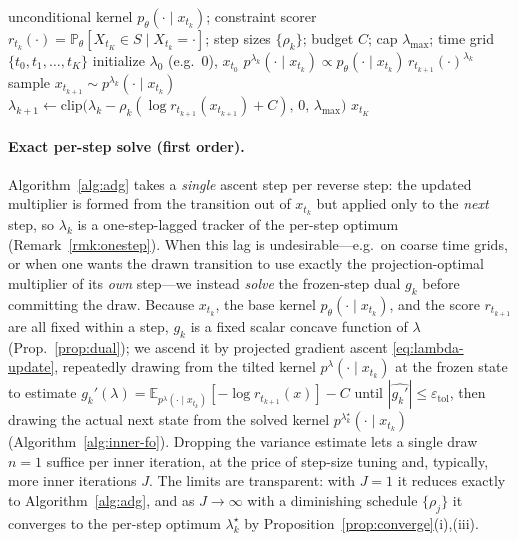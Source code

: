 \documentclass{article}
\newcommand{\E}{\mathbb{E}}
\newcommand{\eps}{\varepsilon}
\newcommand{\lstar}{\lambda^{\star}}
\newcommand{\qlam}{p^{\lambda}(\cdot\mid x_{t_k})}
\begin{document}
\begin{algorithm}[t]
\caption{Adaptive Dual Guidance}
\label{alg:adg}
\begin{algorithmic}[1]
\Require unconditional kernel $p_\theta(\cdot\mid x_{t_k})$; constraint scorer $r_{t_k}(\cdot)=\mathbb P_\theta[X_{t_K}\in S\mid X_{t_k}{=}\cdot]$; step sizes $\{\rho_k\}$; budget $C$; cap $\lambda_{\max}$; time grid $\{t_0,t_1,\dots,t_K\}$
\State initialize $\lambda_0$ (e.g.\ $0$), $x_{t_0}$
  \State $p^{\lambda_k}(\cdot\mid x_{t_k})\propto p_\theta(\cdot\mid x_{t_k})\,r_{t_{k+1}}(\cdot)^{\lambda_k}$ 
  \State sample $x_{t_{k+1}}\sim p^{\lambda_k}(\cdot\mid x_{t_k})$
  \State $\lambda_{k+1}\gets \mathrm{clip}\big(\lambda_k-\rho_k(\log r_{t_{k+1}}(x_{t_{k+1}})+C),\,0,\,\lambda_{\max}\big)$ 
\EndFor
\State \Return $x_{t_K}$
\end{algorithmic}
\end{algorithm}

\paragraph{Exact per-step solve (first order).}
Algorithm~\ref{alg:adg} takes a \emph{single} ascent step per reverse step: the updated multiplier is formed from the transition out of $x_{t_k}$ but applied only to the \emph{next} step, so $\lambda_k$ is a one-step-lagged tracker of the per-step optimum (Remark~\ref{rmk:onestep}). When this lag is undesirable---e.g.\ on coarse time grids, or when one wants the drawn transition to use exactly the projection-optimal multiplier of its \emph{own} step---we instead \emph{solve} the frozen-step dual $g_k$ before committing the draw. Because $x_{t_k}$, the base kernel $p_\theta(\cdot\mid x_{t_k})$, and the score $r_{t_{k+1}}$ are all fixed within a step, $g_k$ is a fixed scalar concave function of $\lambda$ (Prop.~\ref{prop:dual}); we ascend it by projected gradient ascent \eqref{eq:lambda-update}, repeatedly drawing from the tilted kernel $\qlam$ at the frozen state to estimate $g_k'(\lambda)=\E_{\qlam}[-\log r_{t_{k+1}}(x)]-C$ until $|\widehat{g_k'}|\le\eps_{\mathrm{tol}}$, then drawing the actual next state from the solved kernel $p^{\lstar_k}(\cdot\mid x_{t_k})$ (Algorithm~\ref{alg:inner-fo}). Dropping the variance estimate lets a single draw $n{=}1$ suffice per inner iteration, at the price of step-size tuning and, typically, more inner iterations $J$. The limits are transparent: with $J{=}1$ it reduces exactly to Algorithm~\ref{alg:adg}, and as $J\!\to\!\infty$ with a diminishing schedule $\{\rho_j\}$ it converges to the per-step optimum $\lstar_k$ by Proposition~\ref{prop:converge}(i),(iii).
\end{document}
